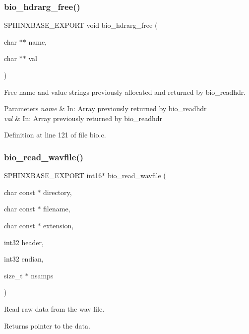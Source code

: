 \subsubsection{bio\+\_\+hdrarg\+\_\+free()}
{\footnotesize\ttfamily S\+P\+H\+I\+N\+X\+B\+A\+S\+E\+\_\+\+E\+X\+P\+O\+RT void bio\+\_\+hdrarg\+\_\+free (\begin{DoxyParamCaption}\item[{char $\ast$$\ast$}]{name,  }\item[{char $\ast$$\ast$}]{val }\end{DoxyParamCaption})}



Free name and value strings previously allocated and returned by bio\+\_\+readhdr. 


\begin{DoxyParams}{Parameters}
{\em name} & In\+: Array previously returned by bio\+\_\+readhdr \\
\hline
{\em val} & In\+: Array previously returned by bio\+\_\+readhdr \\
\hline
\end{DoxyParams}


Definition at line 121 of file bio.\+c.

\mbox{\label{bio_8h_ad878e862c10ca00d8ed7d0e7c21fc5c9}} 
\subsubsection{bio\+\_\+read\+\_\+wavfile()}
{\footnotesize\ttfamily S\+P\+H\+I\+N\+X\+B\+A\+S\+E\+\_\+\+E\+X\+P\+O\+RT int16$\ast$ bio\+\_\+read\+\_\+wavfile (\begin{DoxyParamCaption}\item[{char const $\ast$}]{directory,  }\item[{char const $\ast$}]{filename,  }\item[{char const $\ast$}]{extension,  }\item[{int32}]{header,  }\item[{int32}]{endian,  }\item[{size\+\_\+t $\ast$}]{nsamps }\end{DoxyParamCaption})}



Read raw data from the wav file. 

\begin{DoxyReturn}{Returns}
pointer to the data. 
\end{DoxyReturn}

